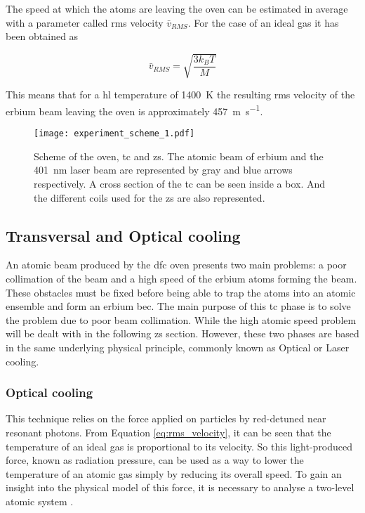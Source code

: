The speed at which the atoms are leaving the oven can be estimated in average with a parameter called \ac{rms} velocity $\bar{v}_{RMS}$. For the case of an ideal gas it has been obtained as \cite{Hansch1975}

\begin{equation}\label{eq:rms_velocity}
	\bar{v}_{RMS} = \sqrt{\frac{3 k_B T}{M}}
\end{equation}

This means that for a \ac{hl} temperature of \SI{1400}{\kelvin} the resulting \ac{rms} velocity of the erbium beam leaving the oven is approximately \SI{457}{\meter\per\second}.



\begin{figure}[!htbp]\centering
	\texttt{[image: experiment\_scheme\_1.pdf]}
	\caption[Oven, \acl{tc} and \acl{zs} schemes]{Scheme of the oven, \acl{tc} and \acl{zs}. The atomic beam of erbium and the \SI{401}{\nano\meter} laser beam are represented by gray and blue arrows respectively. A cross section of the \acl{tc} can be seen inside a box. And the different coils used for the \acl{zs} are also represented.}\label{fig:experiment_scheme_1}
\end{figure}



\subsection{Transversal and Optical cooling}

An atomic beam produced by the \ac{dfc} oven presents two main problems: a poor collimation of the beam and a high speed of the erbium atoms forming the beam. These obstacles must be fixed before being able to trap the atoms into an atomic ensemble and form an erbium \ac{bec}. The main purpose of this \Acf{tc} phase is to solve the problem due to poor beam collimation. While the high atomic speed problem will be dealt with in the following \Acl{zs} section. However, these two phases are based in the same underlying physical principle, commonly known as Optical or Laser cooling. 

\subsubsection{Optical cooling}

This technique relies on the force applied on particles by red-detuned near resonant photons. From Equation \eqref{eq:rms_velocity}, it can be seen that the temperature of an ideal gas is proportional to its velocity. So this light-produced force, known as radiation pressure, can be used as a way to lower the temperature of an atomic gas simply by reducing its overall speed. To gain an insight into the physical model of this force, it is necessary to analyse a two-level atomic system  \cite{Metcalf1999}.

